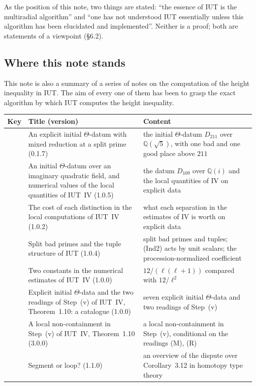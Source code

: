 \documentclass[11pt,a4paper]{article}
\newcommand{\Q}{\mathbb{Q}}
\begin{document}
As the position of this note, two things are stated: ``the essence of IUT is the multiradial algorithm'' and ``one has
not understood IUT essentially unless this algorithm has been elucidated and implemented''. Neither is a proof; both
are statements of a viewpoint (\S6.2).

\subsection{Where this note stands}
This note is also a summary of a series of notes on the computation of the height inequality in IUT. The aim of every
one of them has been to grasp the exact algorithm by which IUT computes the height inequality.

\begin{center}\small
\begin{tabularx}{\textwidth}{@{}l>{\raggedright}p{6.3cm}X@{}}
\toprule
Key & Title (version) & Content\\
\midrule
\cite{First} & An explicit initial $\Theta$-datum with mixed reduction at a split prime (0.1.7) & the initial
$\Theta$-datum $D_{211}$ over $\Q(\sqrt5)$, with one bad and one good place above $211$\\
\cite{Second} & An initial $\Theta$-datum over an imaginary quadratic field, and numerical values of the local quantities
of IUT~IV (1.0.5) & the datum $D_{109}$ over $\Q(i)$ and the local quantities of IV on explicit data\\
\cite{Third} & The cost of each distinction in the local computations of IUT~IV (1.0.2) & what each separation in the
estimates of IV is worth on explicit data\\
\cite{Fourth} & Split bad primes and the tuple structure of IUT (1.0.4) & split bad primes and tuples; (Ind2) acts by
unit scalars; the procession-normalized coefficient\\
\cite{Fifth} & Two constants in the numerical estimates of IUT~IV (1.0.0) & $12/(\ell(\ell+1))$ compared with
$12/\ell^2$\\
\cite{Cat} & Explicit initial $\Theta$-data and the two readings of Step~(v) of IUT~IV, Theorem~1.10: a catalogue (1.0.0) &
seven explicit initial $\Theta$-data and two readings of Step~(v)\\
\cite{Stepv} & A local non-containment in Step~(v) of IUT~IV, Theorem~1.10 (3.0.0) & a local non-containment in
Step~(v), conditional on the readings (M), (R)\\
\cite{SL} & Segment or loop? (1.1.0) & an overview of the dispute over Corollary~3.12 in homotopy type theory\\

\end{tabularx}
\end{center}
\end{document}
